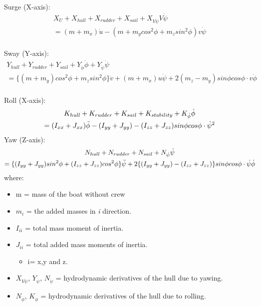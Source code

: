 Surge  (X-axis):
\begin{multline}\label{eq:force_xMasuyama}
    X_{U}+X_{hull}+X_{rudder}+X_{sail}+X_{V\Dot{\psi}}V\Dot{\psi}\\ =(m+m_{x})\Dot{u}-(m+m_{y}cos^2\phi+m_{z}sin^2\phi)v\Dot{\psi}
\end{multline}
\\
Sway  (Y-axis):
\begin{multline}
\label{eq:force_yMasuyama}
Y_{hull} + Y_{rudder} + Y_{sail} + Y_{\Dot{\phi}} \Dot{\phi} + Y_{\Dot{\psi}} \Dot{\psi} \\ 
=\{(m + m_{y})cos^2 \phi + m_{z} sin^2 \phi \} \Dot{v} + (m + m_{x})u \Dot{\psi} + 2(m_{z} - m_{y}) sin\phi cos\phi \cdot v \Dot{\phi}
\end{multline}
\\
Roll (X-axis):
\begin{multline}
     K_{hull} + K_{rudder} + K_{sail} + K_{stability} +K_{\Dot{\phi}} \Dot{\phi} \\
 =(I_{xx} + J_{xx}) \Ddot{\phi} - {(I_{yy} + J_{yy})-(I_{zz} + J_{zz})} sin\phi cos\phi \cdot \Dot{\psi}^2
\end{multline}  \label{eq:m_xMasuyama}
\newline
Yaw (Z-axis):
\begin{multline}
   N_{hull}+N_{rudder}+N_{sail}+N_{\Dot{\psi}}\Dot{\psi}\\
 = \{ (I_{yy} + J_{yy}) sin^2 \phi +(I_{zz} + J_{zz})cos^2 \phi \} \Ddot{\psi} +2 \{(I_{yy} + J_{yy})-(I_{zz} + J_{zz})\}sin\phi cos\phi \cdot \Dot{\psi} \Dot{\phi}  
\end{multline}\label{eq:m_yMasuyama}
\newline
where: 
\begin{itemize}  \label{symbols_motions2}
 \setlength \itemsep{0em}
\item m = mass of the boat without crew
\item $m_{i}$ = the added masses in \textit{i} direction.
\item $I_{ii}$ = total mass moment of inertia.
\item $J_{ii}$ = total added mass moments of inertia.
\begin{itemize}
    \item i= x,y and z.
\end{itemize} 
\item $X_{V\Dot{\psi}}$, $Y_{\Dot{\psi}}$, $N_{\Dot{\psi}}$  = hydrodynamic derivatives of the hull due to yawing.
\item $N_{\Dot{\phi}}$, $K_{\Dot{\phi}}$  = hydrodynamic derivatives of the hull due to rolling.
\end{itemize}

